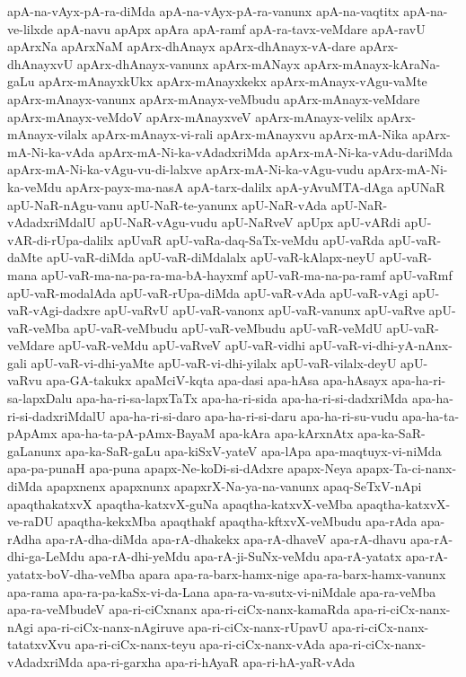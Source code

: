 {apA-na-vAyx-pA-ra-diMda
apA-na-vAyx-pA-ra-vanunx
apA-na-vaqtitx
apA-na-ve-lilxde
apA-navu
apApx
apAra
apA-ramf
apA-ra-tavx-veMdare
apA-ravU
apArxNa
apArxNaM
apArx-dhAnayx
apArx-dhAnayx-vA-dare
apArx-dhAnayxvU
apArx-dhAnayx-vanunx
apArx-mANayx
apArx-mAnayx-kAraNa-gaLu
apArx-mAnayxkUkx
apArx-mAnayxkekx
apArx-mAnayx-vAgu-vaMte
apArx-mAnayx-vanunx
apArx-mAnayx-veMbudu
apArx-mAnayx-veMdare
apArx-mAnayx-veMdoV
apArx-mAnayxveV
apArx-mAnayx-velilx
apArx-mAnayx-vilalx
apArx-mAnayx-vi-rali
apArx-mAnayxvu
apArx-mA-Nika
apArx-mA-Ni-ka-vAda
apArx-mA-Ni-ka-vAdadxriMda
apArx-mA-Ni-ka-vAdu-dariMda
apArx-mA-Ni-ka-vAgu-vu-di-lalxve
apArx-mA-Ni-ka-vAgu-vudu
apArx-mA-Ni-ka-veMdu
apArx-payx-ma-nasA
apA-tarx-dalilx
apA-yAvuMTA-dAga
apUNaR
apU-NaR-nAgu-vanu
apU-NaR-te-yanunx
apU-NaR-vAda
apU-NaR-vAdadxriMdalU
apU-NaR-vAgu-vudu
apU-NaRveV
apUpx
apU-vARdi
apU-vAR-di-rUpa-dalilx
apUvaR
apU-vaRa-daq-SaTx-veMdu
apU-vaRda
apU-vaR-daMte
apU-vaR-diMda
apU-vaR-diMdalalx
apU-vaR-kAlapx-neyU
apU-vaR-mana
apU-vaR-ma-na-pa-ra-ma-bA-hayxmf
apU-vaR-ma-na-pa-ramf
apU-vaRmf
apU-vaR-modalAda
apU-vaR-rUpa-diMda
apU-vaR-vAda
apU-vaR-vAgi
apU-vaR-vAgi-dadxre
apU-vaRvU
apU-vaR-vanonx
apU-vaR-vanunx
apU-vaRve
apU-vaR-veMba
apU-vaR-veMbudu
apU-vaR-veMbudu
apU-vaR-veMdU
apU-vaR-veMdare
apU-vaR-veMdu
apU-vaRveV
apU-vaR-vidhi
apU-vaR-vi-dhi-yA-nAnx-gali
apU-vaR-vi-dhi-yaMte
apU-vaR-vi-dhi-yilalx
apU-vaR-vilalx-deyU
apU-vaRvu
apa-GA-takukx
apaMciV-kqta
apa-dasi
apa-hAsa
apa-hAsayx
apa-ha-ri-sa-lapxDalu
apa-ha-ri-sa-lapxTaTx
apa-ha-ri-sida
apa-ha-ri-si-dadxriMda
apa-ha-ri-si-dadxriMdalU
apa-ha-ri-si-daro
apa-ha-ri-si-daru
apa-ha-ri-su-vudu
apa-ha-ta-pApAmx
apa-ha-ta-pA-pAmx-BayaM
apa-kAra
apa-kArxnAtx
apa-ka-SaR-gaLanunx
apa-ka-SaR-gaLu
apa-kiSxV-yateV
apa-lApa
apa-maqtuyx-vi-niMda
apa-pa-punaH
apa-puna
apapx-Ne-koDi-si-dAdxre
apapx-Neya
apapx-Ta-ci-nanx-diMda
apapxnenx
apapxnunx
apapxrX-Na-ya-na-vanunx
apaq-SeTxV-nApi
apaqthakatxvX
apaqtha-katxvX-guNa
apaqtha-katxvX-veMba
apaqtha-katxvX-ve-raDU
apaqtha-kekxMba
apaqthakf
apaqtha-kftxvX-veMbudu
apa-rAda
apa-rAdha
apa-rA-dha-diMda
apa-rA-dhakekx
apa-rA-dhaveV
apa-rA-dhavu
apa-rA-dhi-ga-LeMdu
apa-rA-dhi-yeMdu
apa-rA-ji-SuNx-veMdu
apa-rA-yatatx
apa-rA-yatatx-boV-dha-veMba
apara
apa-ra-barx-hamx-nige
apa-ra-barx-hamx-vanunx
apa-rama
apa-ra-pa-kaSx-vi-da-Lana
apa-ra-va-sutx-vi-niMdale
apa-ra-veMba
apa-ra-veMbudeV
apa-ri-ciCxnanx
apa-ri-ciCx-nanx-kamaRda
apa-ri-ciCx-nanx-nAgi
apa-ri-ciCx-nanx-nAgiruve
apa-ri-ciCx-nanx-rUpavU
apa-ri-ciCx-nanx-tatatxvXvu
apa-ri-ciCx-nanx-teyu
apa-ri-ciCx-nanx-vAda
apa-ri-ciCx-nanx-vAdadxriMda
apa-ri-garxha
apa-ri-hAyaR
apa-ri-hA-yaR-vAda
}
